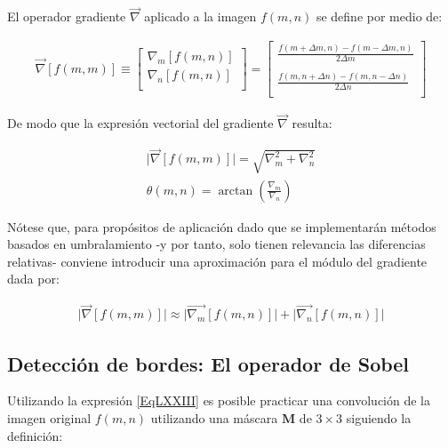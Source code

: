 El operador gradiente $\vec{\nabla}$ aplicado a la imagen $f(m, n)$ se define por medio de:

\begin{eqnarray}
	\vec{\nabla}\left[ f(m, m) \right] \equiv \left[ \begin{array}{c}  \nabla_{m} \left[ f(m, n) \right]  
        \\  \nabla_{n} \left[ f(m, n) \right] \\  \end{array} \right]
	= \left[ \begin{array}{c}  \frac{f(m + \Delta m, n) - f(m - \Delta m, n)}{2 \Delta m} \\ \\  
	 \frac{f(m, n + \Delta n) - f(m, n - \Delta n)}{2 \Delta n} \\  \end{array} \right]
\label{EqLXXIII}
\end{eqnarray}


De modo que la expresi\'on vectorial del gradiente $\vec{\nabla}$ resulta:

\begin{eqnarray}
	\lvert \vec{\nabla}\left[ f(m, m) \right] \rvert = \sqrt{\nabla_{m}^2 + \nabla_{n}^2} \\ \nonumber
	\theta(m, n) = \arctan \left( \frac{\nabla_{m}}{\nabla_{n}} \right)
\label{EqLXXIV}
\end{eqnarray}

N\'otese que, para prop\'ositos de aplicaci\'on dado que se implementar\'an m\'etodos basados en umbralamiento -y por tanto, solo tienen 
relevancia las diferencias relativas- conviene introducir una aproximaci\'on para el m\'odulo del gradiente dada por:

\begin{eqnarray}
	\lvert \vec{\nabla}\left[ f(m, m) \right] \rvert \approx \lvert \vec{\nabla_{m}} \left[ f(m, n) \right]
 \rvert +  \lvert \vec{\nabla_{n}} \left[ f(m, n) \right] \rvert
\label{EqLXXV}
\end{eqnarray}

 
\subsection{Detecci\'on de bordes: El operador de Sobel}
\label{CapV_3}

Utilizando la expresi\'on \ref{EqLXXIII} es posible practicar una convoluci\'on de la imagen original $f(m, n)$ utilizando una m\'ascara 
$\mathbf{M}$ de $3 \times 3$ siguiendo la definici\'on:


